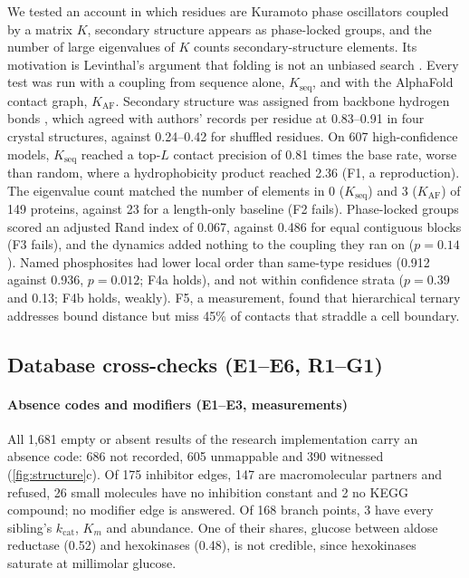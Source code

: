 \documentclass[5p]{elsarticle}
\theoremstyle{definition}
\theoremstyle{plain}
\newcommand{\st}[1]{\textsf{#1}}            %
\begin{document}
We tested an account in which residues are Kuramoto phase oscillators \citep{kuramoto1984chemical} coupled by a matrix $K$, secondary structure appears as phase-locked groups, and the number of large eigenvalues of $K$ counts secondary-structure elements.
Its motivation is Levinthal's argument that folding is not an unbiased search \citep{levinthal1969fold,dill2012folding}.
Every test was run with a coupling from sequence alone, $K_{\mathrm{seq}}$, and with the AlphaFold contact graph, $K_{\mathrm{AF}}$.
Secondary structure was assigned from backbone hydrogen bonds \citep{kabsch1983dssp}, which agreed with authors' records per residue at 0.83--0.91 in four crystal structures, against 0.24--0.42 for shuffled residues.
On 607 high-confidence models, $K_{\mathrm{seq}}$ reached a top-$L$ contact precision of 0.81 times the base rate, worse than random, where a hydrophobicity product reached 2.36 (F1, a reproduction).
The eigenvalue count matched the number of elements in 0 ($K_{\mathrm{seq}}$) and 3 ($K_{\mathrm{AF}}$) of 149 proteins, against 23 for a length-only baseline (F2 fails).
Phase-locked groups scored an adjusted Rand index of 0.067, against 0.486 for equal contiguous blocks (F3 fails), and the dynamics added nothing to the coupling they ran on ($p=0.14$).
Named phosphosites had lower local order than same-type residues (0.912 against 0.936, $p=0.012$; F4a holds), and not within confidence strata ($p=0.39$ and 0.13; F4b holds, weakly).
F5, a measurement, found that hierarchical ternary addresses bound distance but miss 45\% of contacts that straddle a cell boundary.

\subsection{Database cross-checks (E1--E6, R1--G1)}
\label{sec:res-db}

\paragraph{Absence codes and modifiers (E1--E3, measurements)}
All 1{,}681 empty or absent results of the research implementation carry an absence code: 686 not recorded, 605 unmappable and 390 witnessed (\cref{fig:structure}c).
Of 175 inhibitor edges, 147 are macromolecular partners and \st{refused}, 26 small molecules have no inhibition constant and 2 no KEGG compound; no modifier edge is answered.
Of 168 branch points, 3 have every sibling's $k_{\mathrm{cat}}$, $K_m$ and abundance.
One of their shares, glucose between aldose reductase (0.52) and hexokinases (0.48), is not credible, since hexokinases saturate at millimolar glucose.
\end{document}

